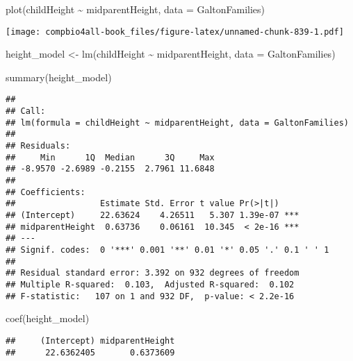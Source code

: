 \documentclass[
]{book}
\newenvironment{Shaded}{\begin{snugshade}}{\end{snugshade}}
\newcommand{\AttributeTok}[1]{\textcolor[rgb]{0.77,0.63,0.00}{#1}}
\newcommand{\FunctionTok}[1]{\textcolor[rgb]{0.00,0.00,0.00}{#1}}
\newcommand{\NormalTok}[1]{#1}
\newcommand{\OtherTok}[1]{\textcolor[rgb]{0.56,0.35,0.01}{#1}}
\newcommand{\SpecialCharTok}[1]{\textcolor[rgb]{0.00,0.00,0.00}{#1}}
\begin{document}
\begin{Shaded}
\begin{Highlighting}[]
\FunctionTok{plot}\NormalTok{(childHeight }\SpecialCharTok{\textasciitilde{}}\NormalTok{ midparentHeight, }\AttributeTok{data =}\NormalTok{ GaltonFamilies)}
\end{Highlighting}
\end{Shaded}

\texttt{[image: compbio4all-book\_files/figure-latex/unnamed-chunk-839-1.pdf]}

\begin{Shaded}
\begin{Highlighting}[]
\NormalTok{height\_model }\OtherTok{\textless{}{-}} \FunctionTok{lm}\NormalTok{(childHeight }\SpecialCharTok{\textasciitilde{}}\NormalTok{ midparentHeight, }\AttributeTok{data =}\NormalTok{ GaltonFamilies)}
\end{Highlighting}
\end{Shaded}

\begin{Shaded}
\begin{Highlighting}[]
\FunctionTok{summary}\NormalTok{(height\_model)}
\end{Highlighting}
\end{Shaded}

\begin{verbatim}
## 
## Call:
## lm(formula = childHeight ~ midparentHeight, data = GaltonFamilies)
## 
## Residuals:
##     Min      1Q  Median      3Q     Max 
## -8.9570 -2.6989 -0.2155  2.7961 11.6848 
## 
## Coefficients:
##                 Estimate Std. Error t value Pr(>|t|)    
## (Intercept)     22.63624    4.26511   5.307 1.39e-07 ***
## midparentHeight  0.63736    0.06161  10.345  < 2e-16 ***
## ---
## Signif. codes:  0 '***' 0.001 '**' 0.01 '*' 0.05 '.' 0.1 ' ' 1
## 
## Residual standard error: 3.392 on 932 degrees of freedom
## Multiple R-squared:  0.103,  Adjusted R-squared:  0.102 
## F-statistic:   107 on 1 and 932 DF,  p-value: < 2.2e-16
\end{verbatim}

\begin{Shaded}
\begin{Highlighting}[]
\FunctionTok{coef}\NormalTok{(height\_model)}
\end{Highlighting}
\end{Shaded}

\begin{verbatim}
##     (Intercept) midparentHeight 
##      22.6362405       0.6373609
\end{verbatim}
\end{document}
